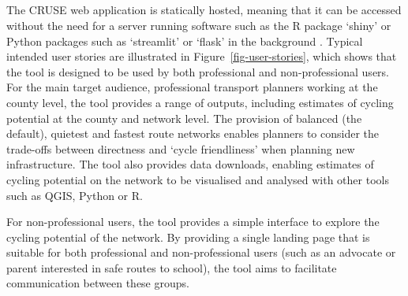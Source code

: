 \documentclass[
  super,
  preprint,
  3p]{elsarticle}
\providecommand{\DIFadd}[1]{{\protect\color{blue}\uwave{#1}}} %
\providecommand{\DIFaddbegin}{} %
\providecommand{\DIFaddend}{} %
\providecommand{\DIFdelbegin}{} %
\providecommand{\DIFdelend}{} %
\newcommand{\DIFscaledelfig}{0.5}
\newlength{\DIFdelgraphicswidth} %
\newlength{\DIFdelgraphicsheight} %
\newcommand{\DIFaddincludegraphics}[2][]{{\color{blue}\fbox{\DIFOincludegraphics[#1]{#2}}}} %
\newcommand{\DIFdelincludegraphics}[2][]{%
\sbox{\DIFdelgraphicsbox}{\DIFOincludegraphics[#1]{#2}}%
\settoboxwidth{\DIFdelgraphicswidth}{\DIFdelgraphicsbox} %
\settoboxtotalheight{\DIFdelgraphicsheight}{\DIFdelgraphicsbox} %
\scalebox{\DIFscaledelfig}{%
\parbox[b]{\DIFdelgraphicswidth}{\usebox{\DIFdelgraphicsbox}\\[-\baselineskip] \rule{\DIFdelgraphicswidth}{0em}}\llap{\resizebox{\DIFdelgraphicswidth}{\DIFdelgraphicsheight}{%
\setlength{\unitlength}{\DIFdelgraphicswidth}%
\begin{picture}(1,1)%
\thicklines\linethickness{2pt} %
{\color[rgb]{1,0,0}\put(0,0){\framebox(1,1){}}}%
{\color[rgb]{1,0,0}\put(0,0){\line( 1,1){1}}}%
{\color[rgb]{1,0,0}\put(0,1){\line(1,-1){1}}}%
\end{picture}%
}\hspace*{3pt}}} %
} %
\DeclareRobustCommand{\DIFaddbegin}{\DIFOaddbegin \let\includegraphics\DIFaddincludegraphics} %
\DeclareRobustCommand{\DIFaddend}{\DIFOaddend \let\includegraphics\DIFOincludegraphics} %
\DeclareRobustCommand{\DIFdelbegin}{\DIFOdelbegin \let\includegraphics\DIFdelincludegraphics} %
\DeclareRobustCommand{\DIFdelend}{\DIFOaddend \let\includegraphics\DIFOincludegraphics} %
\begin{document}
\DIFdelbegin %
\DIFdelend \DIFaddbegin \subsection{\DIFadd{User interface}}\label{sec-ui}
\DIFaddend 

The CRUSE web application is statically hosted, meaning that it can be
accessed without the need for a server running software such as the R
package `shiny' or Python packages such as `streamlit' or `flask' in the
background \citep{wickham2021}. Typical intended user stories are
illustrated in Figure~\ref{fig-user-stories}, which shows that the tool
is designed to be used by both professional and non-professional users.
For the main target audience, professional transport planners working at
the county level, the tool provides a range of outputs, including
estimates of cycling potential at the county and network level. The
provision of balanced (the default), quietest and fastest route networks
enables planners to consider the trade-offs between directness and
`cycle friendliness' when planning new infrastructure. The tool also
provides data downloads, enabling estimates of cycling potential on the
network to be visualised and analysed with other tools such as QGIS,
Python or R.

For non-professional users, the tool provides a simple interface to
explore the cycling potential of the network. By providing a single
landing page that is suitable for both professional and non-professional
users (such as an advocate or parent interested in safe routes to
school), the tool aims to facilitate communication between these groups.
\end{document}
